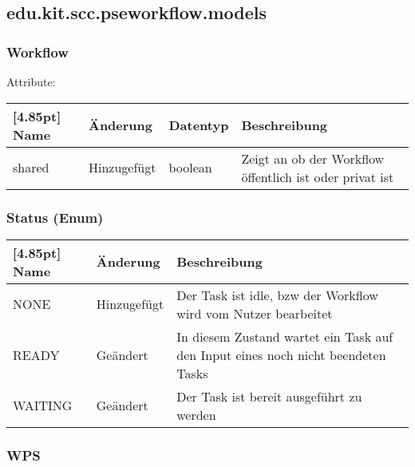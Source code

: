 	
	\newpage

		\subsection{edu.kit.scc.pseworkflow.models}
			\subsubsection{Workflow}
					
			Attribute:
			\begin{center}
				\renewcommand{\arraystretch}{1.5}
				\setlength\tabcolsep{5pt}
				\begin{tabularx}{\textwidth}{|l|l|l|X|}
					\hline
					\rowcolor[gray]{0.9}[4.85pt]					
					Name & Änderung & Datentyp & Beschreibung \\ \hline
					shared & Hinzugefügt & boolean & Zeigt an ob der Workflow öffentlich ist oder privat ist\\ \hline
				\end{tabularx}
			\end{center}


		\subsubsection{Status (Enum)}	
			\begin{center}
				\renewcommand{\arraystretch}{1.5}
				\setlength\tabcolsep{5pt}
				\begin{tabularx}{\textwidth}{|l|l|X|}
					\hline
					\rowcolor[gray]{0.9}[4.85pt]
					Name & Änderung & Beschreibung \\ \hline
					NONE & Hinzugefügt & Der Task ist idle, bzw der Workflow wird vom Nutzer bearbeitet \\ \hline
					READY & Geändert & In diesem Zustand wartet ein Task auf den Input eines noch nicht beendeten Tasks  \\ \hline
					WAITING & Geändert & Der Task ist bereit ausgeführt zu werden \\ \hline
				\end{tabularx}
			\end{center}

		\subsubsection{WPS}
			
